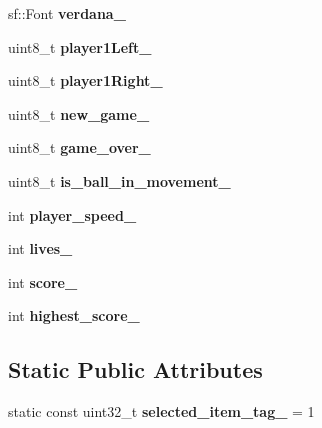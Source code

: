 \begin{DoxyCompactItemize}
\item 
\mbox{\label{class_game_manager_a16df94d56453c106931bf9bb6189bb66}} 
sf\+::\+Font {\bfseries verdana\+\_\+}
\item 
\mbox{\label{class_game_manager_add51e6810cc660aecebdf5cbf2d73b50}} 
uint8\+\_\+t {\bfseries player1\+Left\+\_\+}
\item 
\mbox{\label{class_game_manager_a37ec4169d82f25d4470d3f7215073280}} 
uint8\+\_\+t {\bfseries player1\+Right\+\_\+}
\item 
\mbox{\label{class_game_manager_a1cbf906aa02c7dd30955a6f71eed8038}} 
uint8\+\_\+t {\bfseries new\+\_\+game\+\_\+}
\item 
\mbox{\label{class_game_manager_a81940880b045cfd42329e37b7cfa1a91}} 
uint8\+\_\+t {\bfseries game\+\_\+over\+\_\+}
\item 
\mbox{\label{class_game_manager_a2164107058cfce52b5e8799c09ab8145}} 
uint8\+\_\+t {\bfseries is\+\_\+ball\+\_\+in\+\_\+movement\+\_\+}
\item 
\mbox{\label{class_game_manager_a204290801fd77870f8224dd4a70e5f65}} 
int {\bfseries player\+\_\+speed\+\_\+}
\item 
\mbox{\label{class_game_manager_a4f91050afcc4b728ecff51e4062557d9}} 
int {\bfseries lives\+\_\+}
\item 
\mbox{\label{class_game_manager_abbbdc7dc829fb558eeddf8e7aae384e2}} 
int {\bfseries score\+\_\+}
\item 
\mbox{\label{class_game_manager_a39199aac3993314cd076ed09e8cd4527}} 
int {\bfseries highest\+\_\+score\+\_\+}
\end{DoxyCompactItemize}
\subsection*{Static Public Attributes}
\begin{DoxyCompactItemize}
\item 
\mbox{\label{class_game_manager_adce064d683ccffc7d98dca0f7a2b7b91}} 
static const uint32\+\_\+t {\bfseries selected\+\_\+item\+\_\+tag\+\_\+} = 1
\end{DoxyCompactItemize}


